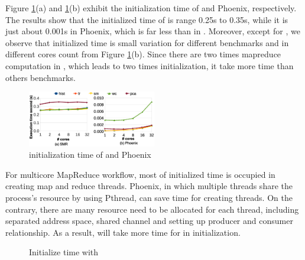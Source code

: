 Figure \ref{fig:env:init}(a) and \ref{fig:env:init}(b) exhibit the initialization time of \myds and Phoenix, respectively.
The results show that the initialized time of \myds is range 0.25s to 0.35s, while it is just about 0.001s in Phoenix, which is far less than in \myds.
Moreover, except for , we observe that initialized time is small variation for different benchmarks and in different cores count from Figure \ref{fig:env:init}(b).
Since there are two times mapreduce computation in , which leads to two times initialization, it take more time than others benchmarks.
\begin{figure}[!h!t]  
	\centering
	\includegraphics[width=0.5\textwidth]{eps/env_init.eps}
	\caption{initialization time of \myds and Phoenix}
	\label{fig:env:init}
\end{figure}


For multicore MapReduce workflow, most of initialized time is occupied in creating map and reduce threads.
Phoenix, in which multiple threads share the process's resource by using Pthread, can save time for creating threads.
On the contrary, there are many resource need to be allocated for each \myth thread, including separated address space, shared channel and setting up producer and consumer relationship.
As a result, \myds will take more time for in initialization.

  
\begin{figure}[htpb]
	\centering
	\caption{Initialize time with \myds}
	\label{fig:init}
\end{figure}


